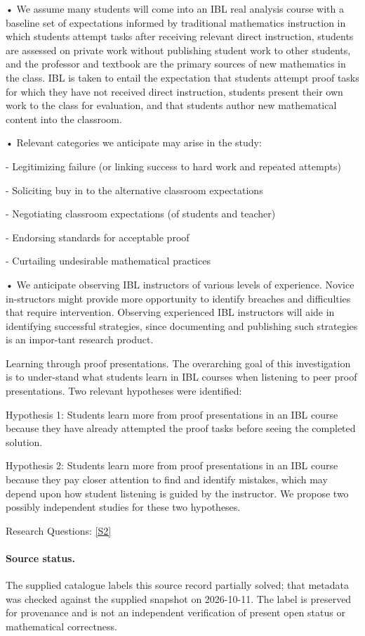 \documentclass[11pt]{article}
\newcommand{\sref}[2]{\hyperlink{source:#1:#2}{[S#2]}}
\begin{document}
• We assume many students will come into an IBL real analysis course with a baseline set of expectations informed by traditional mathematics instruction in which students attempt tasks after receiving relevant direct instruction, students are assessed on private work without publishing student work to other students, and the professor and textbook are the primary sources of new mathematics in the class. IBL is taken to entail the expectation that students attempt proof tasks for which they have not received direct instruction, students present their own work to the class for evaluation, and that students author new mathematical content into the classroom.

• Relevant categories we anticipate may arise in the study:

- Legitimizing failure (or linking success to hard work and repeated attempts)

- Soliciting buy in to the alternative classroom expectations

- Negotiating classroom expectations (of students and teacher)

- Endorsing standards for acceptable proof

- Curtailing undesirable mathematical practices

• We anticipate observing IBL instructors of various levels of experience. Novice in-structors might provide more opportunity to identify breaches and difficulties that require intervention. Observing experienced IBL instructors will aide in identifying successful strategies, since documenting and publishing such strategies is an impor-tant research product.

Learning through proof presentations. The overarching goal of this investigation is to under-stand what students learn in IBL courses when listening to peer proof presentations. Two relevant hypotheses were identified:

Hypothesis 1: Students learn more from proof presentations in an IBL course because they have already attempted the proof tasks before seeing the completed solution.

Hypothesis 2: Students learn more from proof presentations in an IBL course because they pay closer attention to find and identify mistakes, which may depend upon how student listening is guided by the instructor. We propose two possibly independent studies for these two hypotheses.

Research Questions: \sref{20002204}{2}
\paragraph{Source status.}
The supplied catalogue labels this source record partially solved; that metadata was checked against the supplied snapshot on 2026-10-11. The label is preserved for provenance and is not an independent verification of present open status or mathematical correctness.
\end{document}
